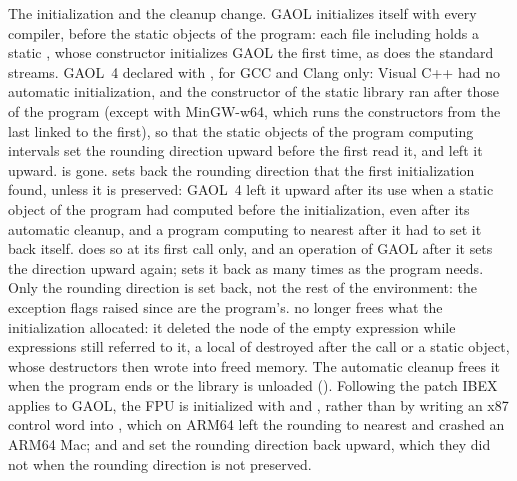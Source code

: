\medskip
The initialization and the cleanup change.\newinvfive{} GAOL initializes
itself with every compiler, before the static objects of the program: each
file including  holds a static
, whose constructor initializes GAOL the
first time, as  does the standard streams. GAOL~4
declared  with ,
for GCC and Clang only: Visual C++ had no automatic initialization, and the
constructor of the static library ran after those of the program (except with
MinGW-w64, which runs the constructors from the last linked to the first), so
that the static objects of the program computing intervals set the rounding
direction upward before the first  read it, and
 left it upward.  is gone.
 sets back the rounding direction that the first
initialization found, unless it is preserved: GAOL~4 left it upward after its
use when a static object of the program had computed before the
initialization, even after its automatic cleanup, and a program computing to
nearest after it had to set it back itself.  does so at its
first call only, and an operation of GAOL after it sets the direction upward
again;  sets it back as many times as the
program needs. Only the rounding direction is set back, not the rest of the
environment: the exception flags raised since are the program's.
 no longer frees what the initialization allocated: it
deleted the node of the empty expression while expressions still referred to
it, a local of  destroyed after the call or a static object,
whose destructors then wrote into freed memory. The automatic cleanup frees
it when the program ends or the library is unloaded ().
Following the patch IBEX applies to GAOL, the FPU is initialized with
 and , rather than by
writing an x87 control word into , which on ARM64 left the
rounding to nearest and crashed an ARM64 Mac; and 
and  set the rounding direction back upward, which they did
not when the rounding direction is not preserved.

